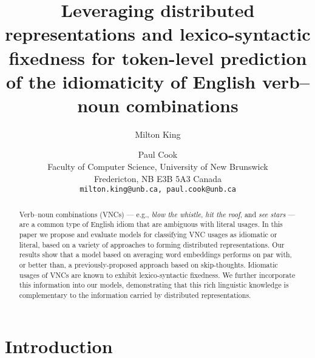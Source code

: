 \documentclass[11pt,a4paper]{article}
\title{Leveraging distributed representations and lexico-syntactic
  fixedness for token-level prediction of the idiomaticity of English
  verb--noun combinations}
\author{Milton King \and Paul Cook \\
Faculty of Computer Science, University of New Brunswick\\
Fredericton, NB E3B 5A3 Canada\\
\tt{milton.king@unb.ca}, \tt{paul.cook@unb.ca}}
\date{}
\begin{document}
\maketitle

\begin{abstract}
Verb--noun combinations (VNCs) --- e.g., \emph{blow the whistle},
\emph{hit the roof}, and \emph{see stars} --- are a common type of
English idiom that are ambiguous with literal usages. In this paper we
propose and evaluate models for classifying VNC usages as idiomatic or
literal, based on a variety of approaches to forming distributed
representations. Our results show that a model
based on averaging word embeddings performs on par with, or better
than,
a previously-proposed approach based on skip-thoughts. Idiomatic
usages of VNCs are known to exhibit lexico-syntactic fixedness. We
further incorporate this information into our models, demonstrating
that this rich linguistic knowledge is complementary to the
information carried by distributed representations.






\end{abstract}

\section{Introduction}



\end{document}
